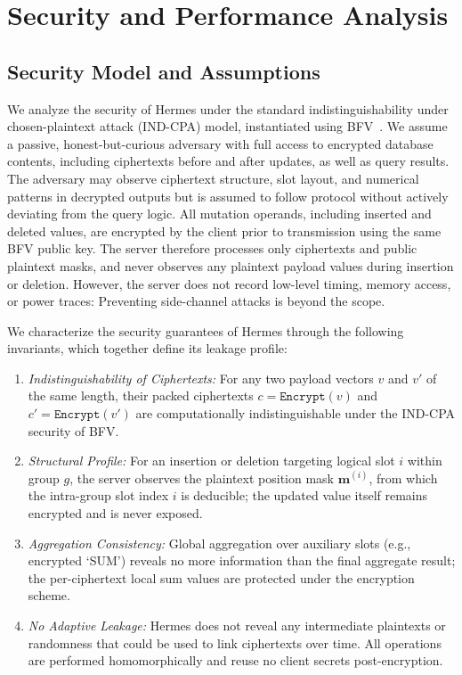 \documentclass[sigconf,nonacm]{acmart}
\begin{document}
\section{Security and Performance Analysis}
\label{sec:analysis}

\subsection{Security Model and Assumptions}
\label{sec:security_model}

We analyze the security of Hermes under the standard indistinguishability under chosen-plaintext attack (IND-CPA) model, instantiated using BFV~\cite{FV2012}. We assume a passive, honest-but-curious adversary with full access to encrypted database contents, including ciphertexts before and after updates, as well as query results. The adversary may observe ciphertext structure, slot layout, and numerical patterns in decrypted outputs but is assumed to follow protocol without actively deviating from the query logic. 
All mutation operands, including inserted and deleted values, are encrypted by the client prior to transmission using the same BFV public key.
The server therefore processes only ciphertexts and public plaintext masks, and never observes any plaintext payload values during insertion or deletion.
However, the server does not record low-level timing, memory access, or power traces: Preventing side-channel attacks is beyond the scope.

We characterize the security guarantees of Hermes through the following invariants, which together define its leakage profile:

\begin{enumerate}
  \item \textit{Indistinguishability of Ciphertexts:} For any two payload vectors $v$ and $v'$ of the same length, their packed ciphertexts $c = \texttt{Encrypt}(v)$ and $c' = \texttt{Encrypt}(v')$ are computationally indistinguishable under the IND-CPA security of BFV.
  
  \item \textit{Structural Profile:} For an insertion or deletion targeting logical slot $i$ within group $g$, the server observes the plaintext position mask $\mathbf{m}^{(i)}$, from which the intra-group slot index $i$ is deducible; the updated value itself remains encrypted and is never exposed.
  
  \item \textit{Aggregation Consistency:} Global aggregation over auxiliary slots (e.g., encrypted `SUM') reveals no more information than the final aggregate result; the per-ciphertext local sum values are protected under the encryption scheme.

  \item \textit{No Adaptive Leakage:} Hermes does not reveal any intermediate plaintexts or randomness that could be used to link ciphertexts over time. All operations are performed homomorphically and reuse no client secrets post-encryption.
\end{enumerate}
\end{document}
